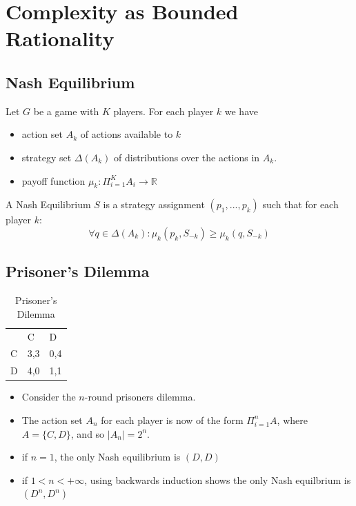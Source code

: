 \documentclass{article}
\begin{document}
\newpage

\section{Complexity as Bounded Rationality}

\subsection{Nash Equilibrium}
	
\noindent Let $G$ be a game with $K$ players. For each player $k$ we have
\begin{itemize}
	\item action set $A_k$ of actions available to $k$
	\item strategy set $\Delta(A_k)$ of distributions over the actions in $A_k$.
	\item payoff function $\mu_k: \Pi_{i=1}^K A_i \longrightarrow \mathbb{R}$
\end{itemize}

\noindent A Nash Equilibrium $S$ is a strategy assignment $(p_1,..., p_k)$ such that for each player $k$:
\begin{equation}
\forall q \in \Delta(A_k): \mu_k(p_k, S_{-k}) \ge \mu_k(q, S_{-k})
\end{equation}

\newpage

\subsection {Prisoner's Dilemma}

\begin{table}[H]
	\centering
	\caption{Prisoner's Dilemma}
	\label{pdpayoffs}
	\begin{tabular}{lll}
		& C                        & D                        \\ \cline{2-3} 
		\multicolumn{1}{l|}{C} & \multicolumn{1}{l|}{3,3} & \multicolumn{1}{l|}{0,4} \\ \cline{2-3} 
		\multicolumn{1}{l|}{D} & \multicolumn{1}{l|}{4,0} & \multicolumn{1}{l|}{1,1} \\ \cline{2-3} 
	\end{tabular}
\end{table}

\begin{itemize}
	\item Consider the $n$-round prisoners dilemma.
	\item The action set $A_n$ for each player is now of the form $\Pi_{i=1}^n A$, where $A = \lbrace C,D \rbrace $, and so $|A_n| = 2^n$.
	\item if $n =1$, the only Nash equilibrium is $(D,D)$
	\item if $1 < n < +\infty$, using backwards induction shows the only Nash equilbrium is $(D^n, D^n)$
\end{itemize}
\end{document}
